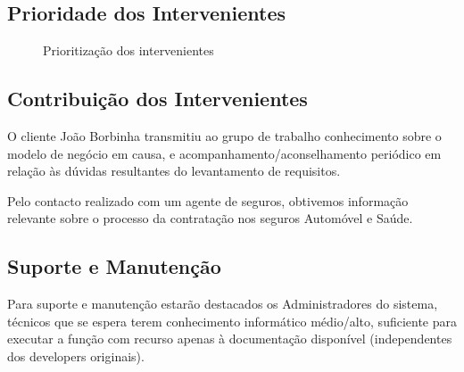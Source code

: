 \subsection{Prioridade dos Intervenientes}

\begin{figure}[!htb]
     \centering
     \caption{Prioritização dos intervenientes}
\end{figure}

\subsection{Contribuição dos Intervenientes}
O cliente João Borbinha transmitiu ao grupo de trabalho conhecimento sobre o modelo de negócio em causa, e acompanhamento/aconselhamento periódico em relação às dúvidas resultantes do levantamento de requisitos. 

Pelo contacto realizado com um agente de seguros, obtivemos informação relevante sobre o processo da contratação nos seguros Automóvel e Saúde.

\subsection{Suporte e Manutenção}
Para suporte e manutenção estarão destacados os Administradores do sistema, técnicos que se espera terem conhecimento informático médio/alto, suficiente para executar a função com recurso apenas à documentação disponível (independentes dos developers originais).

